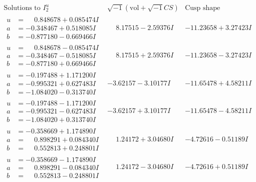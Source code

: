 \documentclass[1p]{elsarticle_modified}
\theoremstyle{definition}
\newcommand{\I}{\sqrt{-1}}
\begin{document}
$$\begin{array}{c|c|c}  
\text{Solutions to }I^u_{2}& \I (\text{vol} + \sqrt{-1}CS) & \text{Cusp shape}\\
 \hline 
\begin{aligned}
u &= \phantom{-}0.848678 + 0.085474 I \\
a &= -0.348467 + 0.518085 I \\
b &= -0.877180 - 0.669466 I\end{aligned}
 & \phantom{-}8.17515 - 2.59376 I & -11.23658 + 3.27423 I \\ \hline\begin{aligned}
u &= \phantom{-}0.848678 - 0.085474 I \\
a &= -0.348467 - 0.518085 I \\
b &= -0.877180 + 0.669466 I\end{aligned}
 & \phantom{-}8.17515 + 2.59376 I & -11.23658 - 3.27423 I \\ \hline\begin{aligned}
u &= -0.197488 + 1.171200 I \\
a &= -0.995321 + 0.627483 I \\
b &= -1.084020 - 0.313740 I\end{aligned}
 & -3.62157 - 3.10177 I & -11.65478 + 4.58211 I \\ \hline\begin{aligned}
u &= -0.197488 - 1.171200 I \\
a &= -0.995321 - 0.627483 I \\
b &= -1.084020 + 0.313740 I\end{aligned}
 & -3.62157 + 3.10177 I & -11.65478 - 4.58211 I \\ \hline\begin{aligned}
u &= -0.358669 + 1.174890 I \\
a &= \phantom{-}0.898291 + 0.084340 I \\
b &= \phantom{-}0.552813 + 0.248801 I\end{aligned}
 & \phantom{-}1.24172 + 3.04680 I & -4.72616 - 0.51189 I \\ \hline\begin{aligned}
u &= -0.358669 - 1.174890 I \\
a &= \phantom{-}0.898291 - 0.084340 I \\
b &= \phantom{-}0.552813 - 0.248801 I\end{aligned}
 & \phantom{-}1.24172 - 3.04680 I & -4.72616 + 0.51189 I \\ \hline\begin{aligned}

\end{aligned}
\end{array}$$
\end{document}
